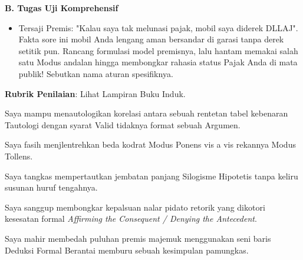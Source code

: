 \documentclass[../main]{subfiles}
\begin{document}
\begin{asesmen}
\textbf{B. Tugas Uji Komprehensif}
\begin{itemize}
  \item Tersaji Premis: "Kalau saya tak melunasi pajak, mobil saya diderek DLLAJ". Fakta sore ini mobil Anda lengang aman bersandar di garasi tanpa derek setitik pun. Rancang formulasi model premisnya, lalu hantam memakai salah satu Modus andalan hingga membongkar rahasia status Pajak Anda di mata publik! Sebutkan nama aturan spesifiknya.
\end{itemize}

\textbf{Rubrik Penilaian}: Lihat Lampiran Buku Induk.
\end{asesmen}


\begin{checklist}
  \item Saya mampu menautologikan korelasi antara sebuah rentetan tabel kebenaran Tautologi dengan syarat Valid tidaknya format sebuah Argumen.
  \item Saya fasih menjlentrehkan beda kodrat Modus Ponens vis a vis rekannya Modus Tollens.
  \item Saya tangkas mempertautkan jembatan panjang Silogisme Hipotetis tanpa keliru susunan huruf tengahnya.
  \item Saya sanggup membongkar kepalsuan nalar pidato retorik yang dikotori kesesatan formal \textit{Affirming the Consequent / Denying the Antecedent}.
  \item Saya mahir membedah puluhan premis majemuk menggunakan seni baris Deduksi Formal Berantai memburu sebuah kesimpulan pamungkas.
\end{checklist}

\end{document}
